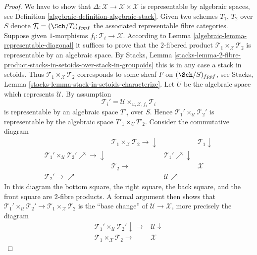 \begin{proof}

We have to show that $\Delta : \mathcal{X} \to \mathcal{X} \times \mathcal{X}$
is representable by algebraic spaces, see
Definition \ref{algebraic-definition-algebraic-stack}.
Given two schemes $T_1$, $T_2$ over $S$ denote
$\mathcal{T}_i = (\Sch/T_i)_{fppf}$ the associated representable
fibre categories. Suppose given $1$-morphisms
$f_i : \mathcal{T}_i \to \mathcal{X}$.
According to
Lemma \ref{algebraic-lemma-representable-diagonal}
it suffices to prove that the $2$-fibered
product $\mathcal{T}_1 \times_\mathcal{X} \mathcal{T}_2$
is representable by an algebraic space. By
Stacks, Lemma
\ref{stacks-lemma-2-fibre-product-stacks-in-setoids-over-stack-in-groupoids}
this is in any case a stack in setoids. Thus
$\mathcal{T}_1 \times_\mathcal{X} \mathcal{T}_2$ corresponds
to some sheaf $F$ on $(\Sch/S)_{fppf}$, see
Stacks, Lemma \ref{stacks-lemma-stack-in-setoids-characterize}.
Let $U$ be the algebraic space which represents $\mathcal{U}$.
By assumption
$$
\mathcal{T}_i' = \mathcal{U} \times_{u, \mathcal{X}, f_i} \mathcal{T}_i
$$
is representable by an algebraic space $T'_i$ over $S$. Hence
$\mathcal{T}_1' \times_\mathcal{U} \mathcal{T}_2'$ is representable
by the algebraic space $T'_1 \times_U T'_2$.
Consider the commutative diagram
$$
\begin{array}{cccc} & \mathcal{T}_1 \times_{\mathcal X} \mathcal{T}_2 \longrightarrow\downarrow &  & \mathcal{T}_1 \downarrow \\ \mathcal{T}_1' \times_\mathcal{U} \mathcal{T}_2' \nearrow\longrightarrow\downarrow &  & \mathcal{T}_1' \nearrow\downarrow &  \\  & \mathcal{T}_2 \longrightarrow &  & \mathcal X \\ \mathcal{T}_2' \longrightarrow\nearrow &  & \mathcal{U} \nearrow & \end{array}
$$
In this diagram the bottom square, the right square, the back square, and
the front square are $2$-fibre products. A formal argument then shows
that $\mathcal{T}_1' \times_\mathcal{U} \mathcal{T}_2' \to
\mathcal{T}_1 \times_{\mathcal X} \mathcal{T}_2$
is the ``base change'' of $\mathcal{U} \to \mathcal{X}$, more precisely
the diagram
$$
\begin{array}{cc}\mathcal{T}_1' \times_\mathcal{U} \mathcal{T}_2' \downarrow\longrightarrow & \mathcal{U} \downarrow \\ \mathcal{T}_1 \times_{\mathcal X} \mathcal{T}_2 \longrightarrow & \mathcal{X}\end{array}
$$
\end{proof}
